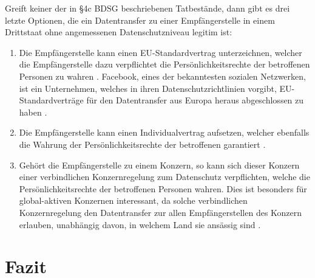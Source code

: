 \par
Greift keiner der in §4c BDSG beschriebenen Tatbestände, dann gibt es drei letzte Optionen, die ein Datentransfer zu einer Empfängerstelle in einem Drittstaat ohne angemessenen Datenschutzniveau legitim ist:
\begin{enumerate}
	\item Die Empfängerstelle kann einen EU-Standardvertrag unterzeichnen, welcher die Empfängerstelle dazu verpflichtet die Persönlichkeitsrechte der betroffenen Personen zu wahren \autocite[vgl.][]{LDI.2017}. Facebook, eines der bekanntesten sozialen Netzwerken, ist ein Unternehmen, welches in ihren Datenschutzrichtlinien vorgibt, EU-Standardverträge für den Datentransfer aus Europa heraus abgeschlossen zu haben \autocite[vgl.][]{FacebookInc..2017}.
	 
	\item Die Empfängerstelle kann einen Individualvertrag aufsetzen, welcher ebenfalls die Wahrung der Persönlichkeitsrechte der betroffenen garantiert \autocite[vgl.][]{LDI.2017}.
	
	\item Gehört die Empfängerstelle zu einem Konzern, so kann sich dieser Konzern einer verbindlichen Konzernregelung zum Datenschutz verpflichten, welche die Persönlichkeitsrechte der betroffenen Personen wahren. Dies ist besonders für global-aktiven Konzernen interessant, da solche verbindlichen Konzernregelung den Datentransfer zur allen Empfängerstellen des Konzern erlauben, unabhängig davon, in welchem Land sie ansässig sind \autocite[vgl.][]{LDI.2017}.
\end{enumerate}

\chapter{Fazit}

